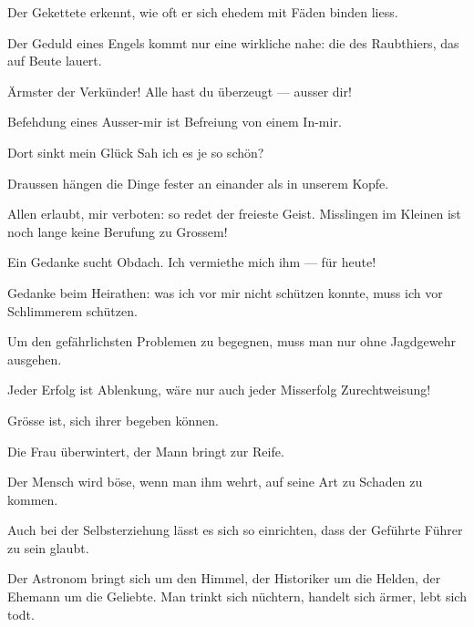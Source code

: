 Der Gekettete erkennt, wie oft er sich ehedem mit Fäden binden liess.
\par

Der Geduld eines Engels kommt nur eine wirkliche nahe: die des Raubthiers, das auf Beute lauert.
\par

Ärmster der Verkünder! Alle hast du überzeugt — ausser dir!
\par

Befehdung eines Ausser-mir ist Befreiung von einem In-mir.
\par

Dort sinkt mein Glück Sah ich es je so schön?
\par

Draussen hängen die Dinge fester an einander als in unserem Kopfe.
\par

Allen erlaubt, mir verboten: so redet der freieste Geist. Misslingen im Kleinen ist noch lange keine Berufung zu Grossem!
\par

Ein Gedanke sucht Obdach. Ich vermiethe mich ihm — für heute!
\par

Gedanke beim Heirathen: was ich vor mir nicht schützen konnte, muss ich vor Schlimmerem schützen.
\par

Um den gefährlichsten Problemen zu begegnen, muss man nur ohne Jagdgewehr ausgehen.
\par

Jeder Erfolg ist Ablenkung, wäre nur auch jeder Misserfolg Zurechtweisung!
\par

Grösse ist, sich ihrer begeben können.
\par

Die Frau überwintert, der Mann bringt zur Reife.
\par

Der Mensch wird böse, wenn man ihm wehrt, auf seine Art zu Schaden zu kommen.
\par

Auch bei der Selbsterziehung lässt es sich so einrichten, dass der Geführte Führer zu sein glaubt.
\par

Der Astronom bringt sich um den Himmel, der Historiker um die Helden, der Ehemann um die Geliebte. Man trinkt sich nüchtern, handelt sich ärmer, lebt sich todt.
\par

